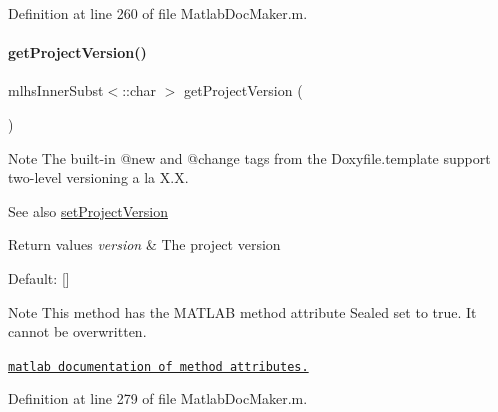 Definition at line 260 of file Matlab\+Doc\+Maker.\+m.

\mbox{\label{class_matlab_doc_maker_a1070db754e27b70e775524e2392a1390}} 
\paragraph{\texorpdfstring{get\+Project\+Version()}{getProjectVersion()}}
{\footnotesize\ttfamily mlhs\+Inner\+Subst$<$\+::char $>$ get\+Project\+Version (\begin{DoxyParamCaption}{ }\end{DoxyParamCaption})\hspace{0.3cm}{\ttfamily [static]}}

\begin{DoxyNote}{Note}
The built-\/in @new and @change tags from the Doxyfile.\+template support two-\/level versioning a la X.\+X.
\end{DoxyNote}
\begin{DoxySeeAlso}{See also}
\hyperlink{class_matlab_doc_maker_a5cf2636bc8dac454f314847775fc9da7}{set\+Project\+Version}
\end{DoxySeeAlso}

\begin{DoxyRetVals}{Return values}
{\em version} & The project version \\
\hline
\end{DoxyRetVals}
\begin{DoxyParagraph}{Default\+:}
\mbox{[}\mbox{]}
\end{DoxyParagraph}
\begin{DoxyNote}{Note}
This method has the M\+A\+T\+L\+AB method attribute {\ttfamily Sealed} set to true. It cannot be overwritten. 

\href{http://www.mathworks.com/help/matlab/matlab_oop/method-attributes.html}{\tt matlab documentation of method attributes.} 
\end{DoxyNote}


Definition at line 279 of file Matlab\+Doc\+Maker.\+m.

